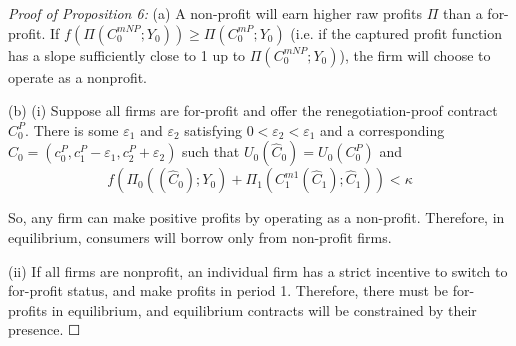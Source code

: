 \documentclass[11pt,english]{article}
\theoremstyle{plain}
\theoremstyle{definition}
\begin{document}
\emph{Proof of Proposition 6:} (a) A non-profit will earn higher raw
profits $\Pi$ than a for-profit. If $f\left(\Pi\left(C_{0}^{mNP};Y_{0}\right)\right)\geq\Pi\left(C_{0}^{mP};Y_{0}\right)$
(i.e. if the captured profit function has a slope sufficiently close
to 1 up to $\Pi\left(C_{0}^{mNP};Y_{0}\right)$), the firm will choose
to operate as a nonprofit.

(b) (i) Suppose all firms are for-profit and offer the renegotiation-proof
contract $C_{0}^{P}$. There is some $\varepsilon_{1}$ and $\varepsilon_{2}$
satisfying $0<\varepsilon_{2}<\varepsilon_{1}$ and a corresponding
$\hat{C}_{0}=\left(c_{0}^{P},c_{1}^{P}-\varepsilon_{1},c_{2}^{P}+\varepsilon_{2}\right)$
such that $U_{0}\left(\hat{C}_{0}\right)=U_{0}\left(C_{0}^{P}\right)$
and 
\[
f\left(\Pi_{0}\left(\left(\hat{C}_{0}\right);Y_{0}\right)+\Pi_{1}\left(C_{1}^{m1}\left(\hat{C}_{1}\right);\hat{C}_{1}\right)\right)<\kappa
\]

So, any firm can make positive profits by operating as a non-profit.
Therefore, in equilibrium, consumers will borrow only from non-profit
firms.

(ii) If all firms are nonprofit, an individual firm has a strict incentive
to switch to for-profit status, and make profits in period 1. Therefore,
there must be for-profits in equilibrium, and equilibrium contracts
will be constrained by their presence. $\Square$



\end{document}
